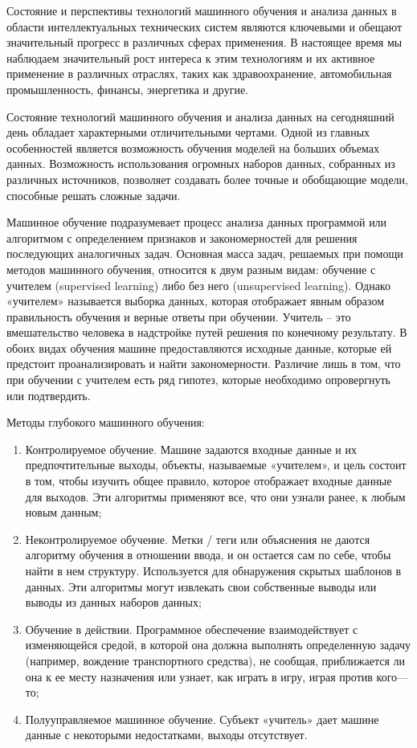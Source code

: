     Состояние и перспективы технологий машинного обучения и анализа данных в области интеллектуальных технических систем являются ключевыми и обещают значительный прогресс в различных сферах применения. В настоящее время мы наблюдаем значительный рост интереса к этим технологиям и их активное применение в различных отраслях, таких как здравоохранение, автомобильная промышленность, финансы, энергетика и другие.
    
    Состояние технологий машинного обучения и анализа данных на сегодняшний день обладает характерными отличительными чертами. Одной из главных особенностей является возможность обучения моделей на больших объемах данных. Возможность использования огромных наборов данных, собранных из различных источников, позволяет создавать более точные и обобщающие модели, способные решать сложные задачи.
    
    Машинное обучение подразумевает процесс анализа данных программой или алгоритмом с определением признаков и закономерностей для решения последующих аналогичных задач. Основная масса задач, решаемых при помощи методов машинного обучения, относится к двум разным видам: обучение с учителем (supervised learning) либо без него (unsupervised learning). Однако «учителем» называется выборка данных, которая отображает явным образом правильность обучения и верные ответы при обучении. Учитель – это вмешательство человека в надстройке путей решения по конечному результату. В обоих видах обучения машине предоставляются исходные данные, которые ей предстоит проанализировать и найти закономерности. Различие лишь в том, что при обучении с учителем есть ряд гипотез, которые необходимо опровергнуть или подтвердить.
    
    Методы глубокого машинного обучения:
    \begin{enumerate}
        \item Контролируемое обучение. Машине задаются входные данные и их предпочтительные выходы, объекты, называемые «учителем», и цель состоит в том, чтобы изучить общее правило, которое отображает входные данные для выходов. Эти алгоритмы применяют все, что они узнали ранее, к любым новым данным;
        \item Неконтролируемое обучение. Метки / теги или объяснения не даются алгоритму обучения в отношении ввода, и он остается сам по себе, чтобы найти в нем структуру. Используется для обнаружения скрытых шаблонов в данных. Эти алгоритмы могут извлекать свои собственные выводы или выводы из данных наборов данных;
        \item Обучение в действии. Программное обеспечение взаимодействует с изменяющейся средой, в которой она должна выполнять определенную задачу (например, вождение транспортного средства), не сообщая, приближается ли она к ее месту назначения или узнает, как играть в игру, играя против кого—то;
        \item Полууправляемое машинное обучение. Субъект «учитель» дает машине данные с некоторыми недостатками, выходы отсутствует.
    \end{enumerate}

